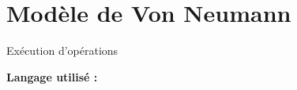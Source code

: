 \section{Modèle de Von Neumann}


\begin{Exercice}[Durée] Exécution d'opérations\\

\begin{conseil}
\end{conseil}
    
\begin{solution}
\textbf{Langage utilisé :}
    
\end{solution}

\end{Exercice}



